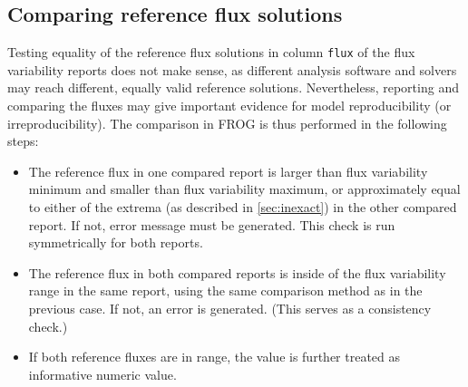 \subsection{Comparing reference flux solutions}
\label{sec:cmpreference}

Testing equality of the reference flux solutions in column \texttt{flux} of the flux variability reports does not make sense, as different analysis software and solvers may reach different, equally valid reference solutions. Nevertheless, reporting and comparing the fluxes may give important evidence for model reproducibility (or irreproducibility). The comparison in FROG is thus performed in the following steps:
\begin{itemize}
\item The reference flux in one compared report is larger than flux variability minimum and smaller than flux variability maximum, or approximately equal to either of the extrema (as described in \cref{sec:inexact}) in the other compared report. If not, error message must be generated. This check is run symmetrically for both reports.
\item The reference flux in both compared reports is inside of the flux variability range in the same report, using the same comparison method as in the previous case. If not, an error is generated. (This serves as a consistency check.)
\item If both reference fluxes are in range, the value is further treated as informative numeric value.
\end{itemize}
